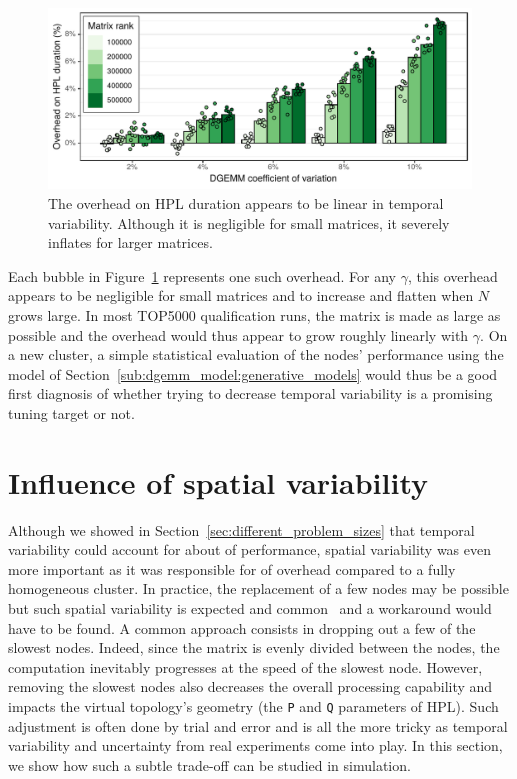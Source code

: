         \begin{figure}[htpb]
            \centering
            \includegraphics[width=\linewidth]{img/prediction/sensibility/temporal/whatif_variability.pdf}

            \caption{The overhead on HPL duration appears to be linear in \dgemm temporal variability. Although
            it is negligible for small matrices, it severely inflates for larger matrices.}
            \label{fig:whatif_variability}
        \end{figure}

        Each bubble in Figure~\ref{fig:whatif_variability} represents one such overhead. For any \(\gamma\), this
        overhead appears to be negligible for small matrices and to increase and flatten when \(N\) grows large. In most
        TOP5000 qualification runs, the matrix is made as large as possible and the overhead would thus appear to grow
        roughly linearly with \(\gamma\). On a new cluster, a simple statistical evaluation of the nodes' performance
        using the model of Section~\ref{sub:dgemm_model:generative_models} would thus be a good first diagnosis of
        whether trying to decrease temporal variability is a promising tuning target or not.

    \section{Influence of \dgemm spatial variability}%
    \label{sec:influence_of_spatial_variability}
        Although we showed in Section~\ref{sec:different_problem_sizes} that temporal variability could account for
        about  of performance, spatial variability was even more important as it was responsible for
         of overhead compared to a fully homogeneous cluster. In practice, the replacement of a few
        nodes may be possible but such spatial variability is expected and common~\cite{rountree_15} and a workaround
        would have to be found. A common approach consists in dropping out a few of the slowest nodes. Indeed, since the
        matrix is evenly divided between the nodes, the computation inevitably progresses at the speed of the slowest
        node. However, removing the slowest nodes also decreases the overall processing capability and impacts the
        virtual topology's geometry (the \texttt{P} and \texttt{Q} parameters of HPL). Such adjustment is often done by
        trial and error and is all the more tricky as temporal variability and uncertainty from real experiments come
        into play. In this section, we show how such a subtle trade-off can be studied in simulation.


